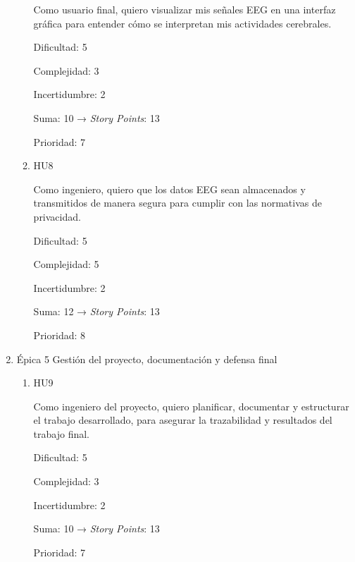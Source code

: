 \documentclass[
11pt, %
]{charter}
\begin{document}
\begin{enumerate}
\begin{enumerate}
		Como usuario final, quiero visualizar mis señales EEG en una interfaz gráfica para entender cómo se interpretan mis actividades cerebrales.\newline
		
		Dificultad: 5
		
		Complejidad: 3
		
		Incertidumbre: 2
		
		Suma: 10 → \textit{Story Points}: 13
		
		Prioridad: 7\newline
		
		\item HU8
		
		Como ingeniero, quiero que los datos EEG sean almacenados y transmitidos de manera segura para cumplir con las normativas de privacidad.\newline
		
		Dificultad: 5
		
		Complejidad: 5
		
		Incertidumbre: 2
		
		Suma: 12 → \textit{Story Points}: 13

		Prioridad: 8\newline
	\end{enumerate}
	\item Épica 5 Gestión del proyecto, documentación y defensa final
	\begin{enumerate}
		\item HU9
		
		Como ingeniero del proyecto, quiero planificar, documentar y estructurar el trabajo desarrollado, para asegurar la trazabilidad y resultados del trabajo final.\newline
		
		Dificultad: 5
		
		Complejidad: 3
		
		Incertidumbre: 2
		
		Suma: 10 → \textit{Story Points}: 13
		
		Prioridad: 7\newline
		
		
	\end{enumerate}
\end{enumerate}
\end{document}
